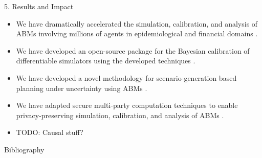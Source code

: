 \documentclass[final,hyperref={pdfpagelabels=false}]{beamer}
\begin{document}
\begin{frame}[t]
\begin{minipage}{\textwidth}
  \begin{block}{5. Results and Impact}
    \begin{itemize}
      \item We have dramatically accelerated the simulation, calibration, and analysis of ABMs involving millions of agents in epidemiological and financial domains \cite{10.5555/3545946.3598851, 10.1145/3604237.3626857, 10.5555/3545946.3598853, bayesian_diff, some_challenges}.
      \item We have developed an open-source package for the Bayesian calibration of differentiable simulators using the developed techniques \cite{blackbirds}.
      \item We have developed a novel methodology for scenario-generation based planning under uncertainty using ABMs \cite{synthpop}.
      \item We have adapted secure multi-party computation techniques to enable privacy-preserving simulation, calibration, and analysis of ABMs \cite{decabm}.
      \item TODO: Causal stuff?
  \end{itemize}
  \end{block}
  \begin{block}{Bibliography}
    \linespread{0.928}\selectfont
    \scriptsize{}
  \end{block}
\end{minipage}

\end{frame} %
\end{document}
